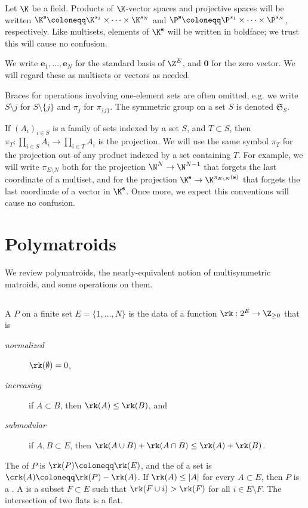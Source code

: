 Let $\K$ be a field. Products of $\K$-vector spaces and projective spaces will be written $\K^{\mathbf s} \coloneqq  \K^{s_1} \times \cdots \times \K^{s_N}$ and $\P^{\mathbf s} \coloneqq  \P^{s_1} \times \cdots \times \P^{s_N}$, respectively.
Like multisets, elements of $\K^{\mathbf s}$ will be written in boldface; we trust this will cause no confusion.

We write $\mathbf e_1, \ldots, \mathbf e_N$ for the standard basis of $\Z^E$,  and $\mathbf 0$ for the zero vector.
We will regard these as multisets or vectors as needed.

Braces for operations involving one-element sets are often omitted, e.g. we write $S \setminus j$ for $S \setminus \{j\}$ and $\pi_j$ for $\pi_{\{j\}}$.
The symmetric group on a set $S$ is denoted $\mathfrak S_S$.

If $(A_i)_{i \in S}$ is a family of sets indexed by a set $S$, and $T \subset S$, then $\pi_T: \prod_{i \in S} A_i \to \prod_{i \in T}A_i$ is the projection.
We will use the same symbol $\pi_T$ for the projection out of any product indexed by a set containing $T$.
For example, we will write $\pi_{E \setminus N}$ both for the projection $\N^N \to \N^{N-1}$ that forgets the last coordinate of a multiset, and for the projection $\K^{\mathbf s} \to \K^{\pi_{E \setminus N}(\mathbf s)}$ that forgets the last coordinate of a vector in $\K^{\mathbf s}$. Once more, we expect this conventions will cause no confusion.

\section{Polymatroids}\label{sec_poly}
We review polymatroids, the nearly-equivalent notion of multisymmetric matroids, and some operations on them.

\subsection{}



\noindent A  $P$ on a finite set $E = \{1, \ldots, N\}$ is the data of a  function $\rk: 2^E \to \Z_{\geq 0}$ that is
\begin{description}
\item[\textit{normalized}] $\rk(\emptyset) = 0$,
\item[\textit{increasing}] if $A \subset B$, then $\rk(A) \leq \rk(B)$, and
\item[\textit{submodular}] if $A, B \subset E$, then $\rk(A \cup B) + \rk(A \cap B) \leq \rk(A) + \rk(B)$.
\end{description}
The  of $P$ is $\rk(P) \coloneqq  \rk(E)$, and 
the  of a set is $\crk(A) \coloneqq  \rk(P) - \rk(A)$.
If $\rk(A) \leq |A|$ for every $A \subset E$, then $P$ is a .
A  is a subset $F \subset E$ such that $\rk(F \cup i) > \rk(F)$ for all $i \in E \setminus F$.
The intersection of two flats is a flat.

